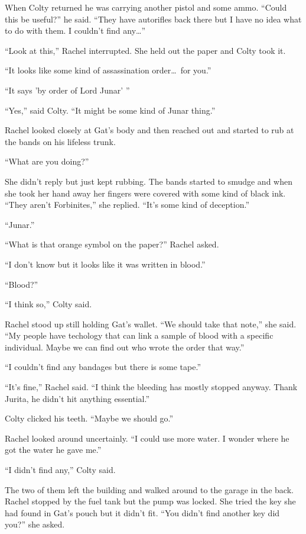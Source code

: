 When Colty returned he was carrying another pistol and some ammo. ``Could this be useful?'' he
said. ``They have autorifles back there but I have no idea what to do with them. I couldn't find
any\ldots''

``Look at this,'' Rachel interrupted. She held out the paper and Colty took it.

``It looks like some kind of assassination order\ldots\ for you.''

``It says 'by order of Lord Junar' ''

``Yes,'' said Colty. ``It might be some kind of Junar thing.''

Rachel looked closely at Gat's body and then reached out and started to rub at the bands on his
lifeless trunk.

``What are you doing?''

She didn't reply but just kept rubbing. The bands started to smudge and when she took her hand
away her fingers were covered with some kind of black ink. ``They aren't Forbinites,'' she
replied. ``It's some kind of deception.''

``Junar.''

``What is that orange symbol on the paper?'' Rachel asked.

``I don't know but it looks like it was written in blood.''

``Blood?''

``I think so,'' Colty said.

Rachel stood up still holding Gat's wallet. ``We should take that note,'' she said. ``My people
have techology that can link a sample of blood with a specific individual. Maybe we can find out
who wrote the order that way.''

``I couldn't find any bandages but there is some tape.''

``It's fine,'' Rachel said. ``I think the bleeding has mostly stopped anyway. Thank Jurita, he
didn't hit anything essential.''

Colty clicked his teeth. ``Maybe we should go.''

Rachel looked around uncertainly. ``I could use more water. I wonder where he got the water he
gave me.''

``I didn't find any,'' Colty said.

The two of them left the building and walked around to the garage in the back. Rachel stopped by
the fuel tank but the pump was locked. She tried the key she had found in Gat's pouch but it
didn't fit. ``You didn't find another key did you?'' she asked.

